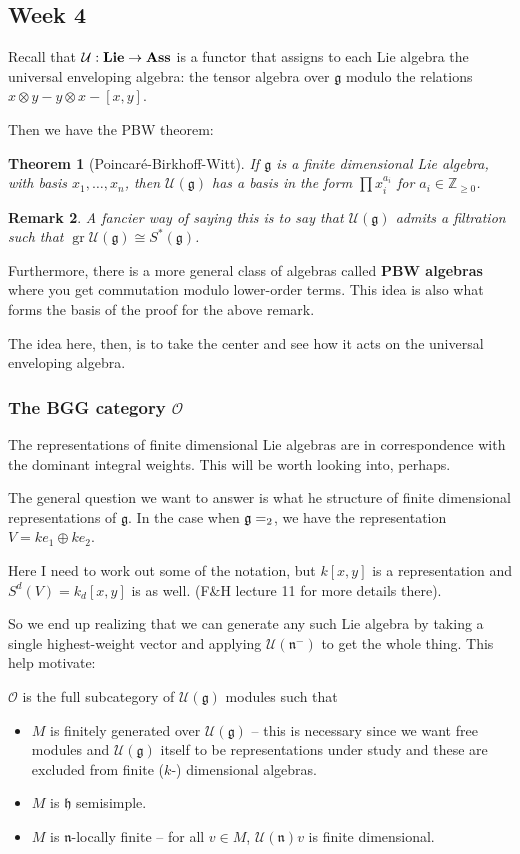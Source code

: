 \documentclass[12pt]{article}
\theoremstyle{nonumberbreak}
\theoremstyle{changebreak}
\newtheorem{thm}{Theorem}[subsection]
\theoremstyle{nonumberplain}
\theoremstyle{change}
\newtheorem{rmk}[thm]{Remark}
\newcommand*{\bbZ}{\mathbb{Z}}
\newcommand*{\g}{\mathfrak{g}}
\newcommand*{\n}{\mathfrak{n}}
\let\sl\relax
\newcommand*{\sl}{\mathfrak{sl}}
\newcommand*{\Ass}{\text{\textbf{Ass}}}
\newcommand*{\Lie}{\text{\textbf{Lie}}}
\begin{document}
\subsection{Week 4}
Recall that $\mathcal{U}:\Lie\to \Ass$ is a functor that assigns to each 
Lie algebra the universal enveloping algebra: the tensor algebra over $\g$ modulo the relations
$x\otimes y-y\otimes x-[x,y]$.

Then we have the PBW theorem:
\begin{thm}[Poincar\'e-Birkhoff-Witt]
	If $\g$ is a finite dimensional Lie algebra, with basis $x_1,\dots,x_n$, then $\mathcal{U}(\g)$ has a basis
	in the form $\prod x_i^{a_i}$ for $a_i\in\bbZ_{\ge 0}$.
\end{thm}
\begin{rmk}
	A fancier way of saying this is to say that $\mathcal{U}(\g)$ admits a filtration such 
	that $\operatorname{gr}\mathcal{U}(\g)\cong S^*(\g)$.
\end{rmk}

Furthermore, there is a more general class of algebras called \textbf{PBW algebras} where you get commutation
modulo lower-order terms. This idea is also what forms the basis of the proof for the above remark.

The idea here, then, is to take the center and see how it acts on the universal enveloping algebra.

\subsubsection{The BGG category $\mathcal{O}$}
The representations of finite dimensional Lie algebras are in correspondence with the dominant integral weights. This
will be worth looking into, perhaps.

The general question we want to answer is what he structure of finite dimensional representations of $\g$. In the case
when $\g=\sl_2$, we have the representation $V=ke_1\oplus ke_2$. 

Here I need to work out some of the notation, but $k[x,y]$ is a representation and $S^d(V)=k_d[x,y]$ is as well. (F\&H lecture 11 for more details there).

So we end up realizing that we can generate any such Lie algebra by taking a single highest-weight vector and 
applying $\mathcal{U}(\mathfrak{n}^-)$ to get the whole thing. This help motivate:
\begin{defn}
	$\mathcal{O}$ is the full subcategory of $\mathcal{U}(\g)$ modules such that
	\begin{itemize}
		\item $M$ is finitely generated over $\mathcal{U}(\g)$ -- this is necessary since we want free modules
		and $\mathcal{U}(\g)$ itself to be representations under study and these are excluded from finite ($k$-) dimensional algebras.
		\item $M$ is $\mathfrak{h}$ semisimple.
		\item $M$ is $\n$-locally finite -- for all $v\in M$, $\mathcal{U}(\n)v$ is finite dimensional.
	\end{itemize}
\end{defn}
\end{document}
